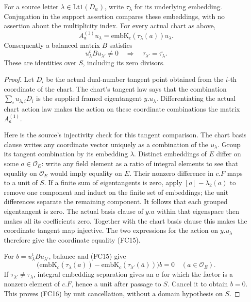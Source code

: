 \begin{srlemma}
\label{lem:sr-source-balanced-correction-conjugate-support}
For a source letter \(\lambda\in\mathrm{Lt1}(D_w)\),
write \(\tau_\lambda\) for its underlying embedding.
Conjugation in the support assertion compares these embeddings,
with no assertion about the multiplicity index.
For every actual chart as above,
\[
 A_a^{(1)}u_\lambda
    =\mathrm{embK}_c(\tau_\lambda(a))u_\lambda.                  \tag{FC15}
\]
Consequently a balanced matrix \(B\) satisfies
\[
 u_\lambda^tBu_{\lambda'}\ne0
                  \quad\Longrightarrow\quad
                          \tau_{\lambda'}=\overline{\tau_\lambda}.           \tag{FC16}
\]
These are identities over \(S\), including its zero divisors.
\end{srlemma}
\begin{proof}
Let \(D_i\) be the actual dual-number tangent point
obtained from the \(i\)-th coordinate of the chart.
The chart's tangent law says that the combination
\(\sum_i u_{\lambda,i}D_i\) is the supplied framed
eigentangent \(y.u_\lambda\).
Differentiating the actual chart action law makes the
action on these coordinate combinations the matrix
\(A_a^{(1)}\).

Here is the source's injectivity check for this tangent
comparison.  The chart basis clause writes any coordinate
vector uniquely as a combination of the \(u_\lambda\).
Group its tangent combination by its embedding \(\lambda\).
Distinct embeddings of \(E\) differ on some
\(a\in\mathcal O_E\): write any field element as a ratio
of integral elements to see that equality on
\(\mathcal O_E\) would imply equality on \(E\).
Their nonzero difference in \(c.F\) maps to a unit of \(S\).
If a finite sum of eigentangents is zero, apply
\([a]-\lambda_2(a)\) to remove one component and induct
on the finite set of embeddings; the unit differences
separate the remaining component.
It follows that each grouped eigentangent is zero.
The actual basis clause of \(y.u\) within that eigenspace
then makes all its coefficients zero.
Together with the chart basis clause this makes the
coordinate tangent map injective.
The two expressions for the action on \(y.u_\lambda\)
therefore give the coordinate equality (FC15).

For \(b=u_\lambda^tBu_{\lambda'}\), balance and (FC15)
give
\[
 \bigl(\mathrm{embK}_c(\tau_\lambda(a))-
       \mathrm{embK}_c(\tau_{\lambda'}(\bar a))\bigr)b=0
                                      \quad(a\in\mathcal O_E).
\]
If \(\tau_{\lambda'}\ne\overline{\tau_\lambda}\), integral embedding
separation gives an \(a\) for which the factor is a
nonzero element of \(c.F\), hence a unit after passage
to \(S\).
Cancel it to obtain \(b=0\).
This proves (FC16) by unit cancellation, without a
domain hypothesis on \(S\).
\end{proof}

